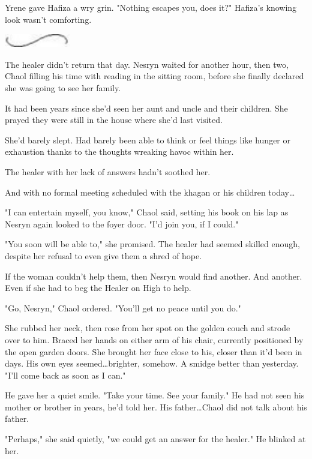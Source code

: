 Yrene gave Hafiza a wry grin. "Nothing escapes you, does it?" Hafiza's knowing look wasn't comforting.

\begin{Center}
\includegraphics[width=1.12in,height=0.24in]{images/seperator}
\end{Center}

The healer didn't return that day. Nesryn waited for another hour, then two, Chaol filling his time with reading in the sitting room, before she finally declared she was going to see her family.

It had been years since she'd seen her aunt and uncle and their children. She prayed they were still in the house where she'd last visited.

She'd barely slept. Had barely been able to think or feel things like hunger or exhaustion thanks to the thoughts wreaking havoc within her.

The healer with her lack of answers hadn't soothed her.

And with no formal meeting scheduled with the khagan or his children today\ldots

"I can entertain myself, you know," Chaol said, setting his book on his lap as Nesryn again looked to the foyer door. "I'd join you, if I could."

"You soon will be able to," she promised. The healer had seemed skilled enough, despite her refusal to even give them a shred of hope.

If the woman couldn't help them, then Nesryn would find another. And another. Even if she had to beg the Healer on High to help.

"Go, Nesryn," Chaol ordered. "You'll get no peace until you do."

She rubbed her neck, then rose from her spot on the golden couch and strode over to him. Braced her hands on either arm of his chair, currently positioned by the open garden doors. She brought her face close to his, closer than it'd been in days. His own eyes seemed\ldots brighter, somehow. A smidge better than yesterday. "I'll come back as soon as I can."

He gave her a quiet smile. "Take your time. See your family." He had not seen his mother or brother in years, he'd told her. His father\ldots Chaol did not talk about his father.

"Perhaps," she said quietly, "we could get an answer for the healer." He blinked at her.

